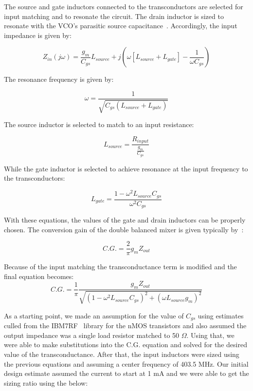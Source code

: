 The source and gate inductors connected to the transconductors are selected for input matching and to resonate the circuit. The drain inductor is sized to resonate with the VCO's parasitic source capacitance~\cite{krcmar1}. Accordingly, the input impedance is given by:

\begin{equation} 
  	Z_{in}(j\omega) = \frac{g_{m}}{C_{gs}}L_{source}+j(\omega[L_{source}+L_{gate}]-\frac{1}{\omega C_{gs}})
	\label{eq:mixerZin}
\end{equation}

The resonance frequency is given by:

\begin{equation}
\omega = \frac{1}{\sqrt{C_{gs}(L_{source}+L_{gate})}}
\end{equation}

The source inductor is selected to match to an input resistance:

\begin{equation}
L_{source} = \frac{R_{input}}{\frac{g_{m}}{C_{gs}}}
\end{equation}

While the gate inductor is selected to achieve resonance at the input frequency to the transconductors:

\begin{equation}
L_{gate}=\frac{1-\omega^{2}L_{source}C_{gs}}{\omega^{2}C_{gs}}
\end{equation}

With these equations, the values of the gate and drain inductors can be properly chosen.
The conversion gain of the double balanced mixer is given typically by~\cite{Razavi}:

\begin{equation}
C.G. = \frac{2}{\pi}g_{m}Z_{out}
\end{equation}

Because of the input matching the transconductance term is modified and the final equation becomes:
\begin{equation}
C.G. = \frac{1}{\pi}\frac{g_{m}Z_{out}}{\sqrt{(1-\omega^{2}L_{source}C_{gs})^{2}+(\omega L_{source}g_{m})^{2}}}
\end{equation}

As a starting point, we made an assumption for the value of $C_{gs}$ using estimates culled from the IBM7RF~\cite{ibm7rf} library for the nMOS transistors and also assumed the output impedance was a single load resistor matched to 50 $\Omega$. Using that, we were able to make substitutions into the C.G. equation and solved for the desired value of the transconductance. After that, the input inductors were sized using the previous equations and assuming a center frequency of 403.5 MHz. Our initial design estimate assumed the current to start at 1 mA and we were able to get the sizing ratio using the below:

